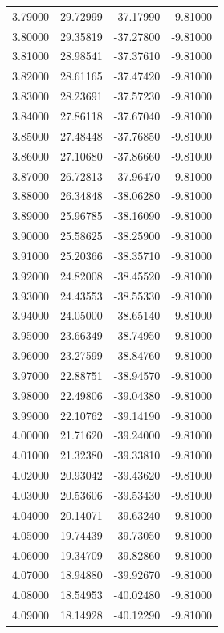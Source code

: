 \begin{table}
\begin{tabular}{llll}
3.79000 & 29.72999 & -37.17990 & -9.81000 \\
3.80000 & 29.35819 & -37.27800 & -9.81000 \\
3.81000 & 28.98541 & -37.37610 & -9.81000 \\
3.82000 & 28.61165 & -37.47420 & -9.81000 \\
3.83000 & 28.23691 & -37.57230 & -9.81000 \\
3.84000 & 27.86118 & -37.67040 & -9.81000 \\
3.85000 & 27.48448 & -37.76850 & -9.81000 \\
3.86000 & 27.10680 & -37.86660 & -9.81000 \\
3.87000 & 26.72813 & -37.96470 & -9.81000 \\
3.88000 & 26.34848 & -38.06280 & -9.81000 \\
3.89000 & 25.96785 & -38.16090 & -9.81000 \\
3.90000 & 25.58625 & -38.25900 & -9.81000 \\
3.91000 & 25.20366 & -38.35710 & -9.81000 \\
3.92000 & 24.82008 & -38.45520 & -9.81000 \\
3.93000 & 24.43553 & -38.55330 & -9.81000 \\
3.94000 & 24.05000 & -38.65140 & -9.81000 \\
3.95000 & 23.66349 & -38.74950 & -9.81000 \\
3.96000 & 23.27599 & -38.84760 & -9.81000 \\
3.97000 & 22.88751 & -38.94570 & -9.81000 \\
3.98000 & 22.49806 & -39.04380 & -9.81000 \\
3.99000 & 22.10762 & -39.14190 & -9.81000 \\
4.00000 & 21.71620 & -39.24000 & -9.81000 \\
4.01000 & 21.32380 & -39.33810 & -9.81000 \\
4.02000 & 20.93042 & -39.43620 & -9.81000 \\
4.03000 & 20.53606 & -39.53430 & -9.81000 \\
4.04000 & 20.14071 & -39.63240 & -9.81000 \\
4.05000 & 19.74439 & -39.73050 & -9.81000 \\
4.06000 & 19.34709 & -39.82860 & -9.81000 \\
4.07000 & 18.94880 & -39.92670 & -9.81000 \\
4.08000 & 18.54953 & -40.02480 & -9.81000 \\
4.09000 & 18.14928 & -40.12290 & -9.81000 \\

\end{tabular}
\end{table}
